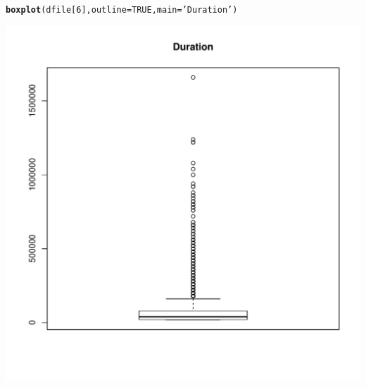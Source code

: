 \documentclass{article}\usepackage[]{graphicx}\usepackage[]{color}
\makeatletter
\def\maxwidth{ %
  \ifdim\Gin@nat@width>\linewidth
    \linewidth
  \else
    \Gin@nat@width
  \fi
}
\newcommand{\hlnum}[1]{\textcolor[rgb]{0.686,0.059,0.569}{#1}}%
\newcommand{\hlstr}[1]{\textcolor[rgb]{0.192,0.494,0.8}{#1}}%
\newcommand{\hlstd}[1]{\textcolor[rgb]{0.345,0.345,0.345}{#1}}%
\newcommand{\hlkwc}[1]{\textcolor[rgb]{0.333,0.667,0.333}{#1}}%
\newcommand{\hlkwd}[1]{\textcolor[rgb]{0.737,0.353,0.396}{\textbf{#1}}}%
\newenvironment{kframe}{%
 \def\at@end@of@kframe{}%
 \ifinner\ifhmode%
  \def\at@end@of@kframe{\end{minipage}}%
  \begin{minipage}{\columnwidth}%
 \fi\fi%
 \def\FrameCommand##1{\hskip\@totalleftmargin \hskip-\fboxsep
 \colorbox{shadecolor}{##1}\hskip-\fboxsep
     \hskip-\linewidth \hskip-\@totalleftmargin \hskip\columnwidth}%
 \MakeFramed {\advance\hsize-\width
   \@totalleftmargin\z@ \linewidth\hsize
   \@setminipage}}%
 {\par\unskip\endMakeFramed%
 \at@end@of@kframe}
\newenvironment{knitrout}{}{} %
\makeatother
\begin{document}
\begin{knitrout}
\color{fgcolor}\begin{kframe}
\begin{alltt}
\hlkwd{boxplot}\hlstd{(dfile[}\hlnum{6}\hlstd{],}\hlkwc{outline}\hlstd{=} \hlnum{TRUE}\hlstd{,}  \hlkwc{main} \hlstd{=} \hlstr{'Duration'}\hlstd{)}
\end{alltt}
\end{kframe}
\includegraphics[width=\maxwidth]{figure/unnamed-chunk-4} 

\end{knitrout}
\end{document}
